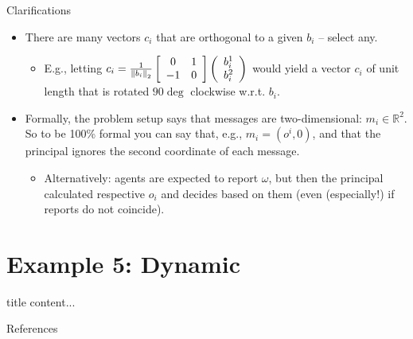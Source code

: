 \documentclass[english,10pt
,aspectratio=169
]{beamer}
\begin{document}
\begin{frame}{Clarifications}
	\begin{itemize}
		\item There are many vectors $c_i$ that are orthogonal to a given $b_i$ -- select any.
		\begin{itemize}
			\item E.g., letting $c_i = \frac{1}{\left\| b_i \right\|_2 } \left[ \begin{array}{c c} 0 & 1 \\ -1 & 0 \end{array} \right] \left( \begin{array}{c}
				b_i^1 \\ b_i^2
			\end{array} \right)$ would yield a vector $c_i$ of unit length that is rotated $90\deg$ clockwise w.r.t. $b_i$.
		\end{itemize}
		\item Formally, the problem setup says that messages are two-dimensional: $m_i \in \mathbb{R}^2$. So to be 100\% formal you can say that, e.g., $m_i = (o^i, 0)$, and that the principal ignores the second coordinate of each message.
		\begin{itemize}
			\item Alternatively: agents are expected to report $\omega$, but then the principal calculated respective $o_i$ and decides based on them (even (especially!) if reports do not coincide).
		\end{itemize}
	\end{itemize}
\end{frame}



\section{Example 5: Dynamic }

\begin{frame}{title}
content...
\end{frame}


\appendix
\begin{frame}[allowframebreaks]{References}


\end{frame}
\end{document}
